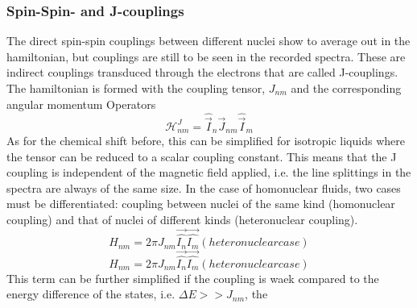         \subsubsection{Spin-Spin- and J-couplings}
        The direct spin-spin couplings between different nuclei show to average out in the hamiltonian, but couplings are still to be seen in the recorded spectra. These are indirect couplings transduced through the electrons that are called J-couplings. The hamiltonian is formed with the coupling tensor, $J_{nm}$ and the corresponding angular momentum Operators
        \begin{equation}
        \mathcal{H}^J_{nm} = \hat{\vec I}_n \vec J_{nm} \hat{\vec I}_m
        \end{equation}
        As for the chemical shift before, this can be simplified for isotropic liquids where the tensor can be reduced to a scalar coupling constant. This means that the J coupling is independent of the magnetic field applied, i.e. the line splittings in the spectra are always of the same size. In the case of homonuclear fluids, two cases must be differentiated: coupling between nuclei of the same kind (homonuclear coupling) and that of nuclei of different kinds (heteronuclear coupling).
        \begin{equation}
            H_{nm} = 2\pi J_{nm} \vec{\hat{I_n}} \vec{\hat{I_m}} (heteronuclear case)
        \end{equation}
        \begin{equation}
            H_{nm} = 2\pi J_{nm} \vec{\hat{I_n}} \vec{\hat{I_m}} (heteronuclear case)
        \end{equation}
        This term can be further simplified if the coupling is waek compared to the energy difference of the states, i.e. $\Delta E >> J_{nm}$, the 
        
